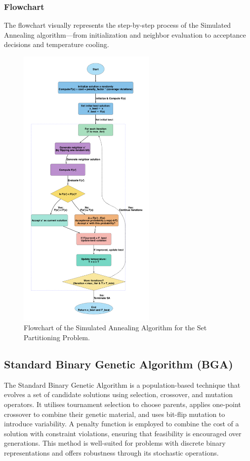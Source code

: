 \documentclass[12pt]{article}
\begin{document}
\subsubsection{Flowchart}
The flowchart visually represents the step-by-step process of the Simulated Annealing algorithm—from initialization and neighbor evaluation to acceptance decisions and temperature cooling.
\begin{figure}[htbp]
  \centering
  \includegraphics[width=0.60\textwidth]{simulated_annealing_flowchart.png}
  \caption{Flowchart of the Simulated Annealing Algorithm for the Set Partitioning Problem.}
  \label{fig:flowchart1}
\end{figure}

\newpage

\subsection{Standard Binary Genetic Algorithm (BGA)}
The Standard Binary Genetic Algorithm is a population-based technique that evolves a set of candidate solutions using selection, crossover, and mutation operators. It utilises tournament selection to choose parents, applies one-point crossover to combine their genetic material, and uses bit-flip mutation to introduce variability. A penalty function is employed to combine the cost of a solution with constraint violations, ensuring that feasibility is encouraged over generations. This method is well-suited for problems with discrete binary representations and offers robustness through its stochastic operations.
\end{document}
